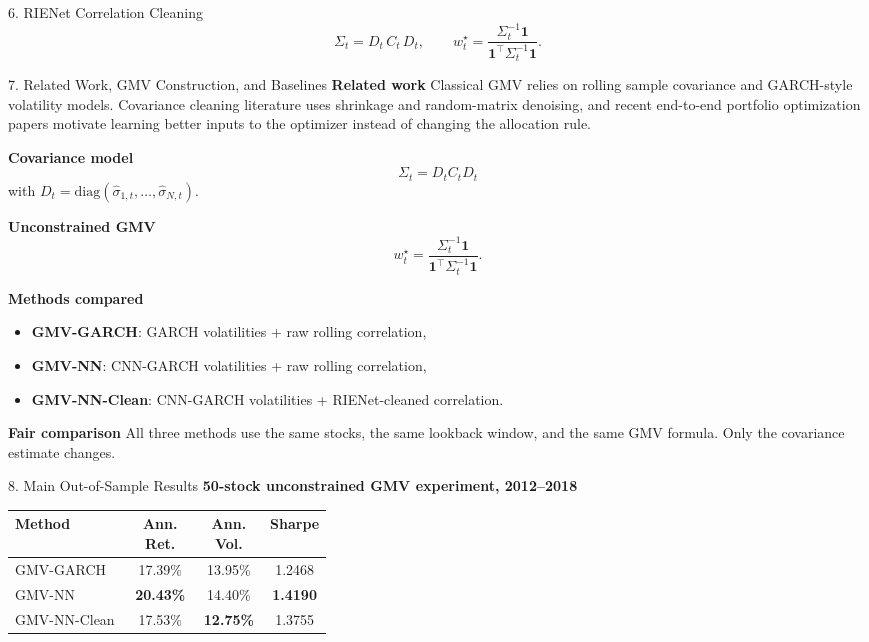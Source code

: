 \documentclass[final]{beamer}
\newlength{\colwidth}
\begin{document}
\begin{frame}[t]
\begin{columns}[t,totalwidth=\textwidth]
\begin{column}{\colwidth}
\begin{block}{6. RIENet Correlation Cleaning}
\[
\Sigma_t = D_t\,C_t\,D_t,
\qquad
w_t^\star = \frac{\Sigma_t^{-1}\mathbf{1}}{\mathbf{1}^{\top}\Sigma_t^{-1}\mathbf{1}}.
\]
\end{block}

\begin{exampleblock}{7. Related Work, GMV Construction, and Baselines}
\small
\textbf{Related work}
Classical GMV relies on rolling sample covariance and GARCH-style volatility models.
Covariance cleaning literature uses shrinkage and random-matrix denoising,
and recent end-to-end portfolio optimization papers motivate learning better inputs to the optimizer
instead of changing the allocation rule.

\textbf{Covariance model}
\[
\Sigma_t = D_t C_t D_t
\]
with \(D_t = \mathrm{diag}(\hat{\sigma}_{1,t},\ldots,\hat{\sigma}_{N,t})\).

\textbf{Unconstrained GMV}
\[
w_t^\star = \frac{\Sigma_t^{-1}\mathbf{1}}{\mathbf{1}^{\top}\Sigma_t^{-1}\mathbf{1}}.
\]

\textbf{Methods compared}
\begin{itemize}
\item \textbf{GMV-GARCH}: GARCH volatilities + raw rolling correlation,
\item \textbf{GMV-NN}: CNN-GARCH volatilities + raw rolling correlation,
\item \textbf{GMV-NN-Clean}: CNN-GARCH volatilities + RIENet-cleaned correlation.
\end{itemize}

\textbf{Fair comparison}
All three methods use the same stocks, the same lookback window, and the same GMV formula.
Only the covariance estimate changes.
\end{exampleblock}

\begin{exampleblock}{8. Main Out-of-Sample Results}
\small
\textbf{50-stock unconstrained GMV experiment, 2012--2018}

\begin{center}
\begin{tabular}{>{\raggedright\arraybackslash}p{0.37\linewidth}ccc}
\toprule
Method & Ann. Ret. & Ann. Vol. & Sharpe \\
\midrule
GMV-GARCH & 17.39\% & 13.95\% & 1.2468 \\
GMV-NN & \textbf{20.43\%} & 14.40\% & \textbf{1.4190} \\
GMV-NN-Clean & 17.53\% & \textbf{12.75\%} & 1.3755 \\
\bottomrule
\end{tabular}
\end{center}


\end{exampleblock}
\end{column}
\end{columns}
\end{frame}
\end{document}
